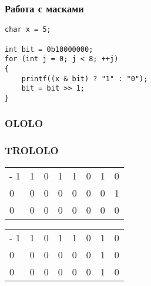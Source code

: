 \documentclass[xetex,mathserif,serif]{beamer}
\begin{document}
	\begin{frame}[fragile]
		\frametitle{Работа с масками}
		\begin{footnotesize}
			\begin{verbatim}
char x = 5;

int bit = 0b10000000;
for (int j = 0; j < 8; ++j)
{
    printf((x & bit) ? "1" : "0");
    bit = bit >> 1;
}
			\end{verbatim}
		\end{footnotesize}

	\end{frame}

	\begin{frame}
		\frametitle{OLOLO}
		\begin{center}
		\end{center}
	\end{frame}

	\begin{frame}
		\frametitle{TROLOLO}
		\begin{tabu} {| X[1 l p] | X[1 l p] | X[1 l p] | X[1 l p] | X[1 l p] | X[1 l p] | X[1 l p] | X[1 l p] |}
			\tabucline-
			\everyrow{\tabucline-}
			1 & 1 & 0 & 1 & 1 & 0 & 1 & 0 \\
			0 & 0 & 0 & 0 & 0 & 0 & 0 & 1 \\
			0 & 0 & 0 & 0 & 0 & 0 & 0 & 0 \\
		\end{tabu}
		\vspace{2cm}
		\begin{tabu} {| X[1 l p] | X[1 l p] | X[1 l p] | X[1 l p] | X[1 l p] | X[1 l p] | X[1 l p] | X[1 l p] |}
			\tabucline-
			\everyrow{\tabucline-}
			1 & 1 & 0 & 1 & 1 & 0 & 1 & 0 \\
			0 & 0 & 0 & 0 & 0 & 0 & 1 & 0 \\
			0 & 0 & 0 & 0 & 0 & 0 & 1 & 0 \\
		\end{tabu}
	\end{frame}
\end{document}
